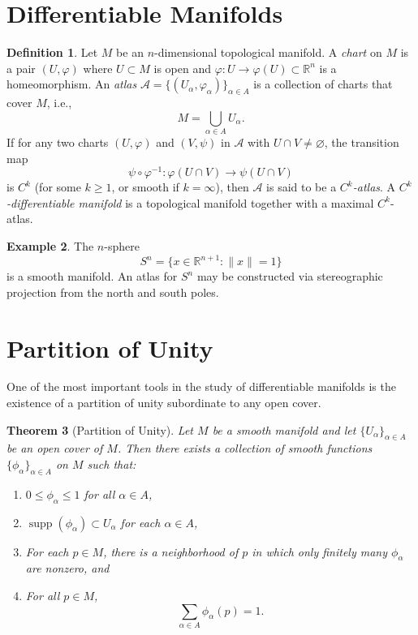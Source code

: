 \documentclass[11pt]{amsart}
\newtheorem{theorem}{Theorem}[section]
\theoremstyle{definition}
\newtheorem{definition}[theorem]{Definition}
\newtheorem{example}[theorem]{Example}
\begin{document}
\section{Differentiable Manifolds}
\begin{definition}
Let $M$ be an $n$-dimensional topological manifold. A \emph{chart} on $M$ is a pair $(U,\varphi)$ where $U\subset M$ is open and $\varphi: U \to \varphi(U)\subset\mathbb{R}^n$ is a homeomorphism. An \emph{atlas} $\mathcal{A}=\{(U_\alpha,\varphi_\alpha)\}_{\alpha\in A}$ is a collection of charts that cover $M$, i.e., 
\[
M=\bigcup_{\alpha\in A} U_\alpha.
\]
If for any two charts $(U,\varphi)$ and $(V,\psi)$ in $\mathcal{A}$ with $U\cap V\neq\varnothing$, the transition map 
\[
\psi\circ\varphi^{-1} : \varphi(U\cap V) \to \psi(U\cap V)
\]
is $C^k$ (for some $k\ge 1$, or smooth if $k=\infty$), then $\mathcal{A}$ is said to be a \emph{$C^k$-atlas}. A \emph{$C^k$-differentiable manifold} is a topological manifold together with a maximal $C^k$-atlas.
\end{definition}

\begin{example}
The $n$-sphere 
\[
S^n = \{ x\in\mathbb{R}^{n+1} : \|x\|=1 \}
\]
is a smooth manifold. An atlas for $S^n$ may be constructed via stereographic projection from the north and south poles.
\end{example}

\section{Partition of Unity}
One of the most important tools in the study of differentiable manifolds is the existence of a partition of unity subordinate to any open cover.

\begin{theorem}[Partition of Unity]
Let $M$ be a smooth manifold and let $\{U_\alpha\}_{\alpha\in A}$ be an open cover of $M$. Then there exists a collection of smooth functions $\{\phi_\alpha\}_{\alpha\in A}$ on $M$ such that:
\begin{enumerate}
    \item $0\le \phi_\alpha\le 1$ for all $\alpha\in A$,
    \item $\operatorname{supp}(\phi_\alpha)\subset U_\alpha$ for each $\alpha\in A$,
    \item For each $p\in M$, there is a neighborhood of $p$ in which only finitely many $\phi_\alpha$ are nonzero, and
    \item For all $p\in M$, 
    \[
    \sum_{\alpha\in A} \phi_\alpha(p)=1.
    \]
\end{enumerate}
\end{theorem}
\end{document}
